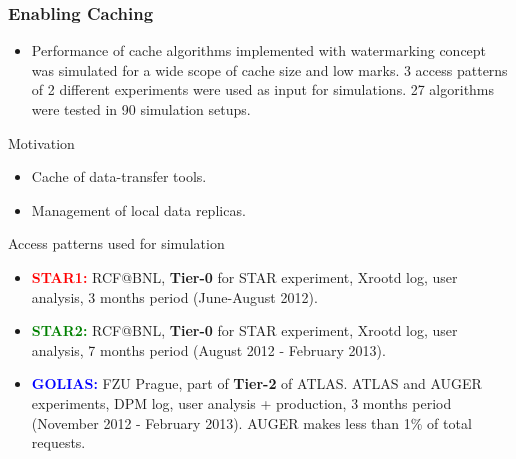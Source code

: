 \documentclass{beamer}
\begin{document}
\begin{frame}\frametitle{Enabling Caching}
\begin{block}{}
\vspace{-5mm}
    \begin{itemize}
        \item Performance of cache algorithms implemented with watermarking concept was simulated for a wide scope of cache size and low marks. 3 access patterns of 2 different experiments were used as input for simulations. 27 algorithms were tested in 90 simulation setups.        
    \end{itemize}
\end{block} 
\vspace{-2mm}
\begin{block}{Motivation}
    \begin{itemize}
        \item Cache of data-transfer tools.   
        \item Management of local data replicas. 
    \end{itemize}
   
\end{block}    


\begin{footnotesize}
\vspace{-2mm}
\begin{block}{Access patterns used for simulation}
\begin{itemize}
	\item[]\textbf{\textcolor{red}{STAR1:}} RCF@BNL, \textbf{Tier-0} for STAR experiment, Xrootd log, user analysis,  3 months period (June-August 2012).

	\item[]\textbf{\textcolor{green}{STAR2:}} RCF@BNL, \textbf{Tier-0} for STAR experiment, Xrootd log, user analysis, 7 months period (August 2012 - February  2013).

	\item[]\textbf{\textcolor{blue}{GOLIAS:}} FZU Prague, part of \textbf{Tier-2} of ATLAS. ATLAS and AUGER experiments, DPM log, user analysis + production,  3 months period (November 2012 - February  2013). AUGER makes less than  1\% of total requests.
\end{itemize}
\end{block}
\end{footnotesize}            
\end{frame}
\end{document}
